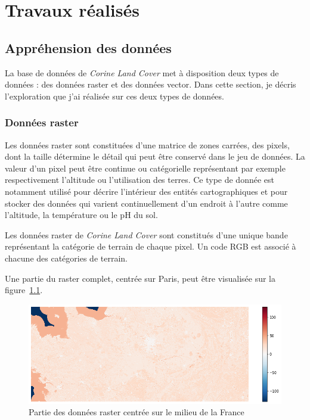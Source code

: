 \chapter{Travaux réalisés}


\section{Appréhension des données}


La base de données de \emph{Corine Land Cover} met à disposition deux types de données : des données raster et des données vector.
Dans cette section, je décris l'exploration que j'ai réalisée sur ces deux types de données.

\subsection{Données raster}

Les données raster sont constituées d'une matrice de zones carrées, des pixels, dont la taille détermine le détail qui peut être conservé dans le jeu de données.
La valeur d'un pixel peut être continue ou catégorielle représentant par exemple respectivement l'altitude ou l'utilisation des terres.
Ce type de donnée est notamment utilisé pour décrire l'intérieur des entités cartographiques et pour stocker des données qui varient continuellement d'un endroit à l'autre comme l'altitude, la température ou le pH du sol.


Les données raster de \emph{Corine Land Cover} sont constitués d'une unique bande représentant la catégorie de terrain de chaque pixel.
Un code RGB est associé à chacune des catégories de terrain.

Une partie du raster complet, centrée sur Paris, peut être visualisée sur la figure~\ref{fig:raster}.

\begin{figure}[!h]
    \centering
    \includegraphics[scale=0.5]{figures/raster}
    \caption{Partie des données raster centrée sur le milieu de la France}
    \label{fig:raster}
\end{figure}


